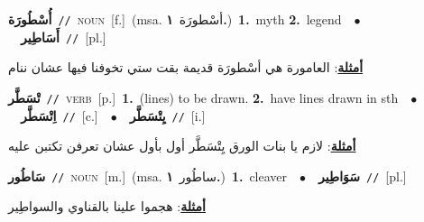 \documentclass[10pt,a4paper,twoside]{article} %
\begin{document}
\begin{multicols}{2}
{\setlength\topsep{0pt}\textbf{\foreignlanguage{arabic}{أُسْطُورَة}}\ {\color{gray}\texttt{//}\color{black}}\ \textsc{noun}\ [f.]\ \color{gray}(msa. \foreignlanguage{arabic}{أسْطورَة}~\foreignlanguage{arabic}{\textbf{١.}})\color{black}\ \textbf{1.}~myth  \textbf{2.}~legend\ \ $\bullet$\ \ \setlength\topsep{0pt}\textbf{\foreignlanguage{arabic}{أَسَاطِير}}\ {\color{gray}\texttt{//}\color{black}}\ [pl.]\  \begin{flushright}\color{gray}\foreignlanguage{arabic}{\textbf{\underline{\foreignlanguage{arabic}{أمثلة}}}: العامورة هي أسْطورَة قديمة بقت ستي تخوفنا فيها عشان ننام}\end{flushright}\color{black}} \vspace{2mm}

{\setlength\topsep{0pt}\textbf{\foreignlanguage{arabic}{تْسَطَّر}}\ {\color{gray}\texttt{//}\color{black}}\ \textsc{verb}\ [p.]\ \textbf{1.}~(lines) to be drawn.  \textbf{2.}~have lines drawn in sth\ \ $\bullet$\ \ \setlength\topsep{0pt}\textbf{\foreignlanguage{arabic}{اِتْسَطَّر}}\ {\color{gray}\texttt{//}\color{black}}\ [c.]\ \ $\bullet$\ \ \setlength\topsep{0pt}\textbf{\foreignlanguage{arabic}{يِتْسَطَّر}}\ {\color{gray}\texttt{//}\color{black}}\ [i.]\  \begin{flushright}\color{gray}\foreignlanguage{arabic}{\textbf{\underline{\foreignlanguage{arabic}{أمثلة}}}: لازم يا بنات الورق يِتْسَطَّر أول بأول عشان تعرفن تكتبن عليه}\end{flushright}\color{black}} \vspace{2mm}

{\setlength\topsep{0pt}\textbf{\foreignlanguage{arabic}{سَاطُور}}\ {\color{gray}\texttt{//}\color{black}}\ \textsc{noun}\ [m.]\ \color{gray}(msa. \foreignlanguage{arabic}{ساطُور}~\foreignlanguage{arabic}{\textbf{١.}})\color{black}\ \textbf{1.}~cleaver\ \ $\bullet$\ \ \setlength\topsep{0pt}\textbf{\foreignlanguage{arabic}{سَوَاطِير}}\ {\color{gray}\texttt{//}\color{black}}\ [pl.]\  \begin{flushright}\color{gray}\foreignlanguage{arabic}{\textbf{\underline{\foreignlanguage{arabic}{أمثلة}}}: هجموا علينا بالقناوي والسواطِير}\end{flushright}\color{black}} \vspace{2mm}


\end{multicols}
\end{document}
